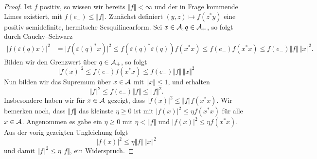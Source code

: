\begin{proof}
    Ist $f$ positiv, so wissen wir bereits $\Vert f \Vert < \infty$ und der in Frage kommende Limes existiert, mit $f(e_-) \leq \Vert f \Vert$. Zunächst definiert $(y, z) \mapsto f(z^* y)$ eine positiv semidefinite, hermitsche Sesquilinearform. Sei $x \in \mathcal{A}, q \in \mathcal{A}_+$, so folgt durch Cauchy--Schwarz
    \begin{align*}
        \vert f(\varepsilon(q) x) \vert^2
        &=
        \vert f(\varepsilon(q)^* x) \vert^2
        \leq
        f(\varepsilon(q)^* \varepsilon(q)) f(x^* x)
        \leq
        f(e_-) f(x^* x)
        \leq
        f(e_-) \Vert f \Vert \, \Vert x \Vert^2.
    \end{align*}
    Bilden wir den Grenzwert über $q \in \mathcal{A}_+$, so folgt
    \[
        \vert f(x) \vert^2
        \leq
        f(e_-) f(x^* x)
        \leq
        f(e_-) \Vert f \Vert \, \Vert x \Vert^2
    \]
    Nun bilden wir das Supremum über $x \in \mathcal{A}$ mit $\Vert x \Vert \leq 1$, und erhalten
    \[
        \Vert f \Vert^2 \leq f(e_-) \Vert f \Vert \leq \Vert f \Vert^2.
    \]
    Insbesondere haben wir für $x \in \mathcal{A}$ gezeigt, dass $\vert f(x) \vert^2 \leq \Vert f \Vert f(x^* x)$. Wir bemerken noch, dass $\Vert f \Vert$ das kleinste $\eta \geq 0$ ist mit $\vert f(x) \vert^2 \leq \eta f(x^* x)$ für alle $x \in \mathcal{A}$. Angenommen es gäbe ein $\eta \geq 0$ mit $\eta < \Vert f \Vert$ und $\vert f(x) \vert^2 \leq \eta f(x^* x)$. Aus der vorig gezeigten Ungleichung folgt
    \[
        \vert f(x) \vert^2 \leq \eta \Vert f \Vert \, \Vert x \Vert^2
    \]
    und damit $\Vert f \Vert^2 \leq \eta \Vert f \Vert$, ein Widerspruch.


\end{proof}
